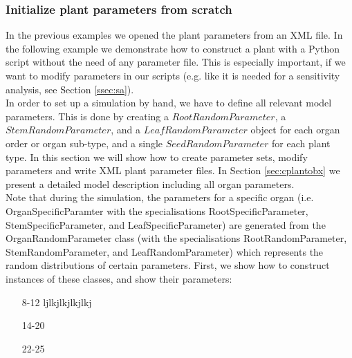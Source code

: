 \subsubsection*{Initialize plant parameters from scratch} 
 
In the previous examples we opened the plant parameters from an XML file. In the following example we demonstrate how to construct a plant with a Python script without the need of any parameter file. This is especially important, if we want to modify parameters in our scripts (e.g. like it is needed for a sensitivity analysis, see Section \ref{ssec:sa}). \\

In order to set up a simulation by hand, we have to define all relevant model parameters. This is done by creating a $RootRandomParameter$, a $StemRandomParameter$, and a $LeafRandomParameter$ object for each organ order or organ sub-type, and a single $SeedRandomParameter$ for each plant type. In this section we will show how to create parameter sets, modify parameters and write XML plant parameter files. In Section \ref{sec:cplantobx} we present a detailed model description including all organ parameters. \\

Note that during the simulation, the parameters for a specific organ (i.e. OrganSpecificParamter with the specialisations RootSpecificParameter, StemSpecificParameter, and LeafSpecificParameter) are generated from the OrganRandomParameter class (with the specialisations RootRandomParameter, StemRandomParameter, and LeafRandomParameter) which represents the random distributions of certain parameters. First, we show how to construct instances of these classes, and show their parameters:

\begin{itemize}
\item[8-12] ljlkjlkjlkjlkj
\item[14-20]
\item[22-25] 
\end{itemize}





